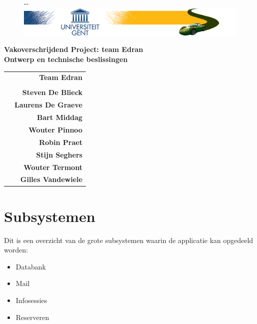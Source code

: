 \documentclass[11pt,a4paper,oneside]{article}
\begin{document}
\begin{titlepage}

\thispagestyle{fancy}
\fancyhf{}
\fancyfoot[L]{}
\begin{figure}[!ht]
  \begin{adjustwidth}{-\oddsidemargin-1in}{-\rightmargin}
    \centering
    \includegraphics[width=\paperwidth]{img/banner}
  \end{adjustwidth}
\end{figure}
\vspace{-0.2em}
\begin{center}
\vspace{5cm}
\Huge \textbf{Vakoverschrijdend Project: team Edran\\ Ontwerp en technische beslissingen}\\
\vspace{6.0cm}
\large
\begin{tabular}{L! {} R}
& {\LARGE\bf Team Edran} \\
& \\
& {\bf Steven De Blieck} \\
& {\bf Laurens De Graeve} \\
& {\bf Bart Middag} \\
& {\bf Wouter Pinnoo} \\
& {\bf Robin Praet} \\
& {\bf Stijn Seghers} \\
& {\bf Wouter Termont} \\
& {\bf Gilles Vandewiele} \\
\end{tabular}
\end{center}
\end{titlepage}
\restoregeometry
\newpage

\fancyheadoffset[RO,LE]{0in}

\fancyfoot[L]{}
\fancyfoot[C]{\thepage}
\pagestyle{fancy}

\section{Subsystemen}
Dit is een overzicht van de grote subsystemen waarin de applicatie kan opgedeeld worden:
\begin{itemize}
\item Databank
\item Mail
\item Infosessies
\item Reserveren
\end{itemize}
\end{document}
